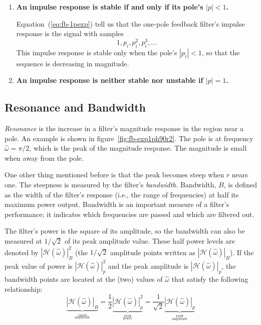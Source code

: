 \begin{enumerate}
\item \textbf{An impulse response is stable if and only if its pole's
$|p|<1$.}

Equation~(\ref{eq:fb-1pexp}) tell us that the 
one-pole feedback filter's impulse response is the signal with samples
\begin{equation}
1, p_i, p_i^2, p_i^3, \ldots
\end{equation}
This impulse response is stable only when the pole's $|p_i|<1$, so
that the sequence is decreasing in magnitude.

\item \textbf{An impulse response is neither stable nor unstable if
$|p|=1$.}
\end{enumerate}

\subsection{Resonance and Bandwidth}

\emph{Resonance} is the increase in a filter's magnitude response in
the region near a pole. An example is shown in
figure~\ref{fig:fb-exp1ph90r2}. The pole is at frequency
$\hat{\omega}=\pi/2$, which is the peak of the magnitude response. The
magnitude is small when away from the pole.

One other thing mentioned before is that the peak becomes steep
when $r$ nears one. The steepness is measured by the filter's
\emph{bandwidth}.
Bandwidth, $B$, is defined as the width of the
filter's response (i.e., the range of frequencies) at half its maximum
power output. Bandwidth is an important measure of a filter's
performance; it indicates which frequencies are passed and which are
filtered out.

The filter's power is the square of its amplitude, so the bandwidth
can also be measured at $1/\sqrt{2}$ of its peak amplitude value.
These half power levels are denoted by
$|\mathcal{H}(\hat{\omega})|_B^2$ (the $1/\sqrt{2}$ amplitude points
written as $|\mathcal{H}(\hat{\omega})|_B$). If the peak value of
power is $|\mathcal{H}(\hat{\omega})|_p^2$ and the peak amplitude is
$|\mathcal{H}(\hat{\omega})|_p$, the bandwidth points are located at
the (two) values of $\hat{\omega}$ that satisfy the following
relationship:
\begin{equation}
\underbrace{|\mathcal{H}(\hat{\omega})|_B}_{\stackrel{\text{cutoff}}{_\text{amplitude}}}
  = \frac{1}{2}\underbrace{|\mathcal{H}(\hat{\omega})|_p^2}_{\stackrel{\text{peak}}{_\text{power}}}
  = \frac{1}{\sqrt{2}}\underbrace{|\mathcal{H}(\hat{\omega})|_p}_{\stackrel{\text{peak}}{_\text{amplitude}}}
\label{eq:fb-band}
\end{equation}

